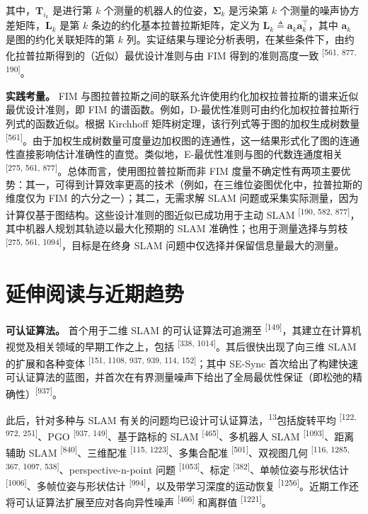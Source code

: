 其中，$\pmb { T } _ { i _ { k } }$ 是进行第 $k$ 个测量的机器人的位姿，$\pmb{\Sigma} _ { k }$ 是污染第 $k$ 个测量的噪声协方差矩阵，$\pmb{L} _ { k }$ 是第 $k$ 条边的约化基本拉普拉斯矩阵，定义为 $\pmb { L } _ { k } \triangleq \pmb { a } _ { k } \pmb { a } _ { k } ^ { \top }$，其中 $\pmb { a } _ { k }$ 是图的约化关联矩阵的第 $k$ 列。实证结果与理论分析表明，在某些条件下，由约化拉普拉斯得到的（近似）最优设计准则与由 FIM 得到的准则高度一致 \textsuperscript{[561, 877, 190]}。

\textbf{实践考量。} FIM 与图拉普拉斯之间的联系允许使用约化加权拉普拉斯的谱来近似最优设计准则，即 FIM 的谱函数。例如，D-最优性准则可由约化加权拉普拉斯行列式的函数近似。根据 Kirchhoff 矩阵树定理，该行列式等于图的加权生成树数量 \textsuperscript{[561]}。由于加权生成树数量可度量边加权图的连通性，这一结果形式化了图的连通性直接影响估计准确性的直觉。类似地，E-最优性准则与图的代数连通度相关 \textsuperscript{[275, 561, 877]}。总体而言，使用图拉普拉斯而非 FIM 度量不确定性有两项主要优势：其一，可得到计算效率更高的技术（例如，在三维位姿图优化中，拉普拉斯的维度仅为 FIM 的六分之一）；其二，无需求解 SLAM 问题或采集实际测量，因为计算仅基于图结构。这些设计准则的图近似已成功用于主动 SLAM \textsuperscript{[190, 582, 877]}，其中机器人规划其轨迹以最大化预期的 SLAM 准确性；也用于测量选择与剪枝 \textsuperscript{[275, 561, 1094]}，目标是在终身 SLAM 问题中仅选择并保留信息量最大的测量。

\section{延伸阅读与近期趋势}

\textbf{可认证算法。} 首个用于二维 SLAM 的可认证算法可追溯至 \textsuperscript{[149]}，其建立在计算机视觉及相关领域的早期工作之上，包括 \textsuperscript{[338, 1014]}。其后很快出现了向三维 SLAM 的扩展和各种变体 \textsuperscript{[151, 1108, 937, 939, 114, 152]}；其中 SE-Sync 首次给出了构建快速可认证算法的蓝图，并首次在有界测量噪声下给出了全局最优性保证（即松弛的精确性）\textsuperscript{[937]}。

此后，针对多种与 SLAM 有关的问题均已设计可认证算法，\textsuperscript{13}包括旋转平均 \textsuperscript{[122, 972, 251]}、PGO \textsuperscript{[937, 149]}、基于路标的 SLAM \textsuperscript{[465]}、多机器人 SLAM \textsuperscript{[1093]}、距离辅助 SLAM \textsuperscript{[840]}、三维配准 \textsuperscript{[115, 1223]}、多集合配准 \textsuperscript{[501]}、双视图几何 \textsuperscript{[116, 1285, 367, 1097, 538]}、perspective-n-point 问题 \textsuperscript{[1053]}、标定 \textsuperscript{[382]}、单帧位姿与形状估计 \textsuperscript{[1006]}、多帧位姿与形状估计 \textsuperscript{[994]}，以及带学习深度的运动恢复 \textsuperscript{[1256]}。近期工作还将可认证算法扩展至应对各向异性噪声 \textsuperscript{[466]} 和离群值 \textsuperscript{[1221]}。

